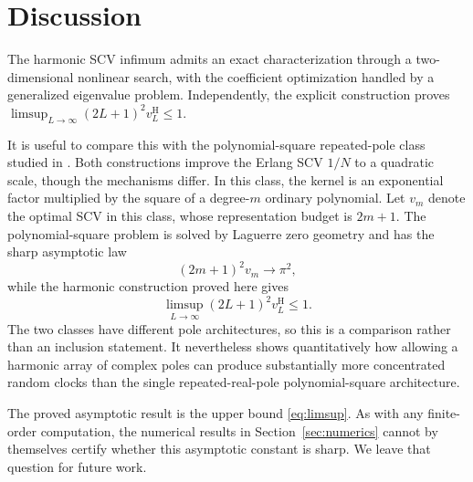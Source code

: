\documentclass[11pt]{article}
\numberwithin{equation}{section}
\theoremstyle{remark}
\newcommand{\vH}{v^{\mathrm H}}
\begin{document}
\section{Discussion}\label{sec:discussion}

The harmonic SCV infimum admits an exact characterization through a two-dimensional nonlinear search, with the coefficient optimization handled by a generalized eigenvalue problem. Independently, the explicit construction proves $\limsup_{L\to\infty}(2L+1)^2\vH_L\leq1$.

It is useful to compare this with the polynomial-square repeated-pole class studied in \citet{BattagliolaPeralta2026PolynomialSquare}. Both constructions improve the Erlang SCV $1/N$ to a quadratic scale, though the mechanisms differ. In this class, the kernel is an exponential factor multiplied by the square of a degree-$m$ ordinary polynomial. Let $v_m$ denote the optimal SCV in this class, whose representation budget is $2m+1$. The polynomial-square problem is solved by Laguerre zero geometry and has the sharp asymptotic law
\[
  (2m+1)^2v_m\longrightarrow\pi^2,
\]
while the harmonic construction proved here gives
\[
  \limsup_{L\to\infty}(2L+1)^2\vH_L\leq1.
\]
The two classes have different pole architectures, so this is a comparison rather than an inclusion statement. It nevertheless shows quantitatively how allowing a harmonic array of complex poles can produce substantially more concentrated random clocks than the single repeated-real-pole polynomial-square architecture.

The proved asymptotic result is the upper bound \eqref{eq:limsup}. As with any finite-order computation, the numerical results in Section~\ref{sec:numerics} cannot by themselves certify whether this asymptotic constant is sharp. We leave that question for future work.
\end{document}
